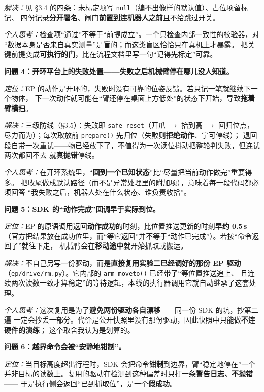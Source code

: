 \documentclass[12pt,a4paper]{ctexart}
\begin{document}
\textit{解决：}见 §3.4 的四条：未标定项写 \texttt{null}（编不出像样的默认值）、占位项留标记、
四份记录\textbf{分开署名}、闸门\textbf{前置到连机器人之前}且不给跳过开关。

\textit{个人思考：}检查项“通过”不等于“前提成立”。一个只检查内部一致性的校验器，对
“数据本身是否来自真实测量”是\textbf{盲}的；而这类盲区恰恰只在真机上才暴露。
把关键前提变成\textbf{可执行的门}，比在流程文档里写一句“记得先标定”可靠。

\medskip
\textbf{问题 4：开环平台上的失败处置——失败之后机械臂停在哪儿没人知道。}

\textit{定位：}EP 的动作是开环的，失败时没有可靠的位姿反馈。若只记一笔就继续下一个物体，
下一次动作就可能在“臂还停在桌面上方低处”的状态下开始，导致\textbf{拖着臂横扫}。

\textit{解决：}三级防线（§3.5）：失败即 \texttt{safe\_reset}（开爪 $\to$ 抬到高 $\to$ 回归位点，
尽力而为）；每次取放前 \texttt{prepare()} 先归位（失败则\textbf{拒绝动作}、宁可停线）；
退回段自带一次重试——物已经放下了，不值得为一次读位抖动把整轮判失败，但连试两次都回不去
就\textbf{真抛错}停线。

\textit{个人思考：}在开环系统里，“\textbf{回到一个已知状态}”比“尽量把当前动作做完”重要得多。
把收尾做成默认路径（而不是异常处理里的附加项），意味着每一段代码都必须回答
“我失败之后，机器人处在什么状态、谁负责收拾”。

\medskip
\textbf{问题 5：SDK 的“动作完成”回调早于实际到位。}

\textit{定位：}EP 的原语调用返回\textbf{动作成功}的时刻，比位置推送更新的时刻\textbf{早约 0.5\,s}
（官方把结果放在成功位里，而“等它返回”并不等于“动作已完成”）。若按“命令返回了”就往下走，
机械臂会在\textbf{移动途中}就开始抓取或搬运。

\textit{解决：}不自己另写一份驱动，而是\textbf{直接复用实验二已经调好的那份 EP 驱动}
（\texttt{ep/drive/rm.py}）。它内部的 \texttt{arm\_moveto()} 已经带了“等位置推送追上、
且连续两次读数一致才算稳定”的等待逻辑，本线的执行器调用它就自动继承了这套处理。

\textit{个人思考：}这次复用是为了\textbf{避免两份驱动各自漂移}——同一份 SDK 的坑，抄第二遍
一定会抄丢一部分。代价是公开快照里没有那份驱动，因此快照中只能做\textbf{不连硬件的演练}；
这个取舍我认为是划算的。

\medskip
\textbf{问题 6：越界命令会被“安静地钳制”。}

\textit{定位：}当目标高度超出行程时，SDK 会把命令\textbf{钳制}到边界，臂“稳定地停在”一个
并非目标的读数上。复用的驱动在检测到这种偏差时只打一条\textbf{警告日志、不抛错}——
于是执行侧会返回“已到抓取位”，是一个\textbf{假成功}。
\end{document}
